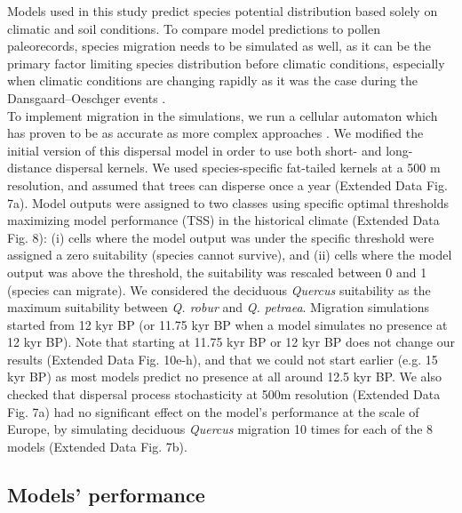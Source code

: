 \documentclass[pdflatex, sn-nature]{sn-jnl}%
\newcommand{\textappr}{\raisebox{0.5ex}{\texttildelow}} %
\begin{document}
Models used in this study predict species potential distribution based solely on climatic and soil conditions. To compare model predictions to pollen paleorecords, species migration needs to be simulated as well, as it can be the primary factor limiting species distribution before climatic conditions, especially when climatic conditions are changing rapidly as it was the case during the Dansgaard–Oeschger events \cite{Svenning2004, Saltre2013}.  \\
To implement migration in the simulations, we run a  cellular automaton \cite{Engler2012} which has proven to be as accurate as more complex approaches \cite{Zurell2016}. We modified the initial version of this dispersal model in order to use both short- and long-distance dispersal kernels. We used species-specific fat-tailed kernels \cite{Zani2022} at a 500 m resolution, and assumed that trees can disperse once a year (Extended Data Fig. 7a). Model outputs were assigned to two classes using specific optimal thresholds maximizing model performance (TSS) in the historical climate (Extended Data Fig. 8): (i) cells where the model output was under the specific threshold were assigned a zero suitability (species cannot survive), and (ii) cells where the  model output was above the threshold, the suitability was rescaled between 0 and 1 (species can migrate). We considered the deciduous \emph{Quercus} suitability as the maximum suitability between \emph{Q. robur} and \emph{Q. petraea}. Migration simulations started from 12 kyr BP (or 11.75 kyr BP when a model simulates no presence at 12 kyr BP). Note that starting at 11.75 kyr BP or 12 kyr BP does not change our results (Extended Data Fig. 10e-h), and that we could not start earlier (e.g. \textappr15 kyr BP) as most models predict no presence at all around 12.5 kyr BP. We also checked that dispersal process stochasticity at 500m resolution (Extended Data Fig. 7a) had no significant effect on the model's performance at the scale of Europe, by simulating deciduous \emph{Quercus} migration 10 times for each of the 8 models (Extended Data Fig. 7b). 

\subsection{Models' performance}\label{skill}
\end{document}

